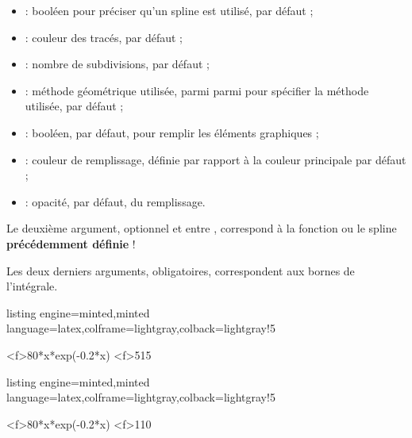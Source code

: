 \documentclass[11pt,a4paper]{ltxdoc}
\begin{document}
\begin{itemize}
  \item {} : booléen pour préciser qu'un spline est utilisé,  par défaut ;
  \item {} : couleur des tracés,  par défaut ;
  \item {} : nombre de subdivisions,  par défaut ;
  \item {} : méthode géométrique utilisée, parmi parmi  pour spécifier la méthode utilisée,  par défaut ;
  \item {} : booléen,  par défaut, pour remplir les éléments graphiques ;
  \item {} : couleur de remplissage, définie par rapport à la couleur principale par défaut ;
  \item {} : opacité,  par défaut, du remplissage.
\end{itemize}

\smallskip

Le deuxième argument, optionnel et entre , correspond à la fonction ou le spline \textbf{précédemment définie} !

\smallskip

Les deux derniers arguments, obligatoires, correspondent aux bornes de l'intégrale.

\begin{tcblisting}{listing engine=minted,minted language=latex,colframe=lightgray,colback=lightgray!5}
\begin{GraphiqueTikz}
  [x=0.66cm,y=0.033cm,Xmin=0,Xmax=21,Xgrille=2,Xgrilles=1,
  Ymin=0,Ymax=160,Ygrille=20,Ygrilles=10]
  \DefinirCourbe[Couleur=red,Nom=cf,Debut=1,Fin=20,Trace]<f>{80*x*exp(-0.2*x)}
  \RepresenterMethodeIntegrale[Couleur=teal]<f>{5}{15}
\end{GraphiqueTikz}
\end{tcblisting}

\begin{tcblisting}{listing engine=minted,minted language=latex,colframe=lightgray,colback=lightgray!5}
\begin{GraphiqueTikz}
  [x=0.66cm,y=0.033cm,Xmin=0,Xmax=21,Xgrille=2,Xgrilles=1,
  Ymin=0,Ymax=160,Ygrille=20,Ygrilles=10]
  \DefinirCourbe[Couleur=red,Nom=cf,Debut=1,Fin=20,Trace]<f>{80*x*exp(-0.2*x)}
  \RepresenterMethodeIntegrale
    [Methode=RectanglesDroite,Couleur=orange,NbSubDiv=7]<f>{1}{10}
\end{GraphiqueTikz}
\end{tcblisting}
\end{document}
